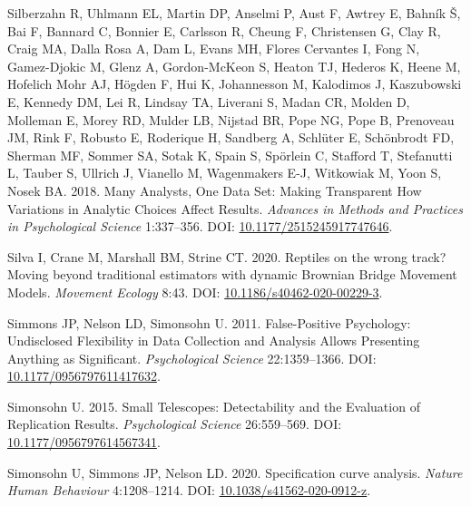 \documentclass[10pt,a4paper]{article}
\newlength{\cslhangindent}
\newlength{\cslentryspacingunit} %
\newenvironment{CSLReferences}[2] %
 {%
  \setlength{\parindent}{0pt}
  \ifodd #1
  \let\oldpar\par
  \def\par{\hangindent=\cslhangindent\oldpar}
  \fi
  \setlength{\parskip}{#2\cslentryspacingunit}
 }%
 {}
\begin{document}
\begin{CSLReferences}{1}{0}
\leavevmode{}%
Silberzahn R, Uhlmann EL, Martin DP, Anselmi P, Aust F, Awtrey E, Bahník Š, Bai F, Bannard C, Bonnier E, Carlsson R, Cheung F, Christensen G, Clay R, Craig MA, Dalla Rosa A, Dam L, Evans MH, Flores Cervantes I, Fong N, Gamez-Djokic M, Glenz A, Gordon-McKeon S, Heaton TJ, Hederos K, Heene M, Hofelich Mohr AJ, Högden F, Hui K, Johannesson M, Kalodimos J, Kaszubowski E, Kennedy DM, Lei R, Lindsay TA, Liverani S, Madan CR, Molden D, Molleman E, Morey RD, Mulder LB, Nijstad BR, Pope NG, Pope B, Prenoveau JM, Rink F, Robusto E, Roderique H, Sandberg A, Schlüter E, Schönbrodt FD, Sherman MF, Sommer SA, Sotak K, Spain S, Spörlein C, Stafford T, Stefanutti L, Tauber S, Ullrich J, Vianello M, Wagenmakers E-J, Witkowiak M, Yoon S, Nosek BA. 2018. Many {Analysts}, {One} {Data} {Set}: {Making} {Transparent} {How} {Variations} in {Analytic} {Choices} {Affect} {Results}. \emph{Advances in Methods and Practices in Psychological Science} 1:337--356. DOI: \href{https://doi.org/10.1177/2515245917747646}{10.1177/2515245917747646}.

\leavevmode{}%
Silva I, Crane M, Marshall BM, Strine CT. 2020. Reptiles on the wrong track? {Moving} beyond traditional estimators with dynamic {Brownian} {Bridge} {Movement} {Models}. \emph{Movement Ecology} 8:43. DOI: \href{https://doi.org/10.1186/s40462-020-00229-3}{10.1186/s40462-020-00229-3}.

\leavevmode{}%
Simmons JP, Nelson LD, Simonsohn U. 2011. False-{Positive} {Psychology}: {Undisclosed} {Flexibility} in {Data} {Collection} and {Analysis} {Allows} {Presenting} {Anything} as {Significant}. \emph{Psychological Science} 22:1359--1366. DOI: \href{https://doi.org/10.1177/0956797611417632}{10.1177/0956797611417632}.

\leavevmode{}%
Simonsohn U. 2015. Small {Telescopes}: {Detectability} and the {Evaluation} of {Replication} {Results}. \emph{Psychological Science} 26:559--569. DOI: \href{https://doi.org/10.1177/0956797614567341}{10.1177/0956797614567341}.

\leavevmode{}%
Simonsohn U, Simmons JP, Nelson LD. 2020. Specification curve analysis. \emph{Nature Human Behaviour} 4:1208--1214. DOI: \href{https://doi.org/10.1038/s41562-020-0912-z}{10.1038/s41562-020-0912-z}.


\end{CSLReferences}
\end{document}
